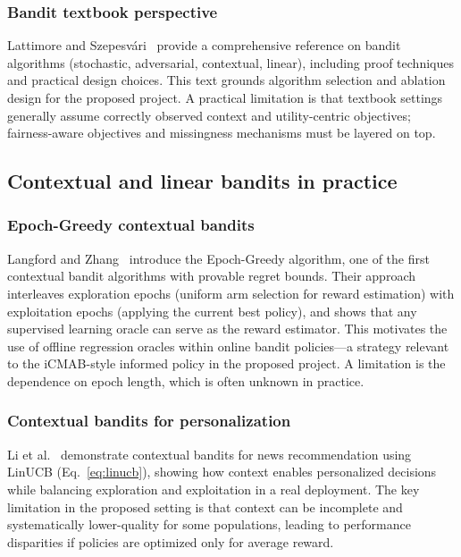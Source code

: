 \documentclass[conference]{IEEEtran}
\begin{document}
\subsubsection{Bandit textbook perspective}
Lattimore and Szepesv\'{a}ri~\cite{lattimore2020bandit} provide a comprehensive reference on
bandit algorithms (stochastic, adversarial, contextual, linear), including proof techniques
and practical design choices. This text grounds algorithm selection and ablation design for
the proposed project. A practical limitation is that textbook settings generally assume
correctly observed context and utility-centric objectives; fairness-aware objectives and
missingness mechanisms must be layered on top.


\subsection{Contextual and linear bandits in practice}

\subsubsection{Epoch-Greedy contextual bandits}
Langford and Zhang~\cite{langford2007epoch} introduce the Epoch-Greedy algorithm, one of the
first contextual bandit algorithms with provable regret bounds. Their approach interleaves
exploration epochs (uniform arm selection for reward estimation) with exploitation epochs
(applying the current best policy), and shows that any supervised learning oracle can serve
as the reward estimator. This motivates the use of offline regression oracles within online
bandit policies---a strategy relevant to the iCMAB-style informed policy in the proposed
project. A limitation is the dependence on epoch length, which is often unknown in practice.

\subsubsection{Contextual bandits for personalization}
Li et al.~\cite{li2010contextual} demonstrate contextual bandits for news recommendation
using LinUCB (Eq.~\ref{eq:linucb}), showing how context enables personalized decisions while
balancing exploration and exploitation in a real deployment. The key limitation in the
proposed setting is that context can be incomplete and systematically lower-quality for some
populations, leading to performance disparities if policies are optimized only for average
reward.
\end{document}

